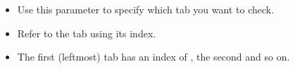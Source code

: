   \begin{itemize}
\item Use this parameter to specify which tab you want to check.
\item Refer to the tab using its index.
\item The first (leftmost) tab has an index of , the second  and so on.
\end{itemize}

      
